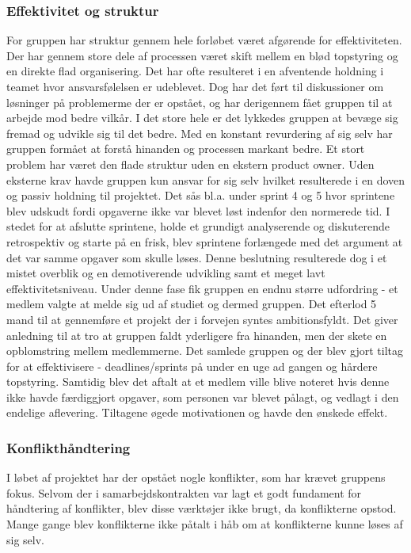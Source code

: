 \subsubsection{Effektivitet og struktur}
For gruppen har struktur gennem hele forløbet været afgørende for effektiviteten. Der har gennem store dele af processen været skift mellem en blød topstyring og en direkte flad organisering. Det har ofte resulteret i en afventende holdning i teamet hvor ansvarsfølelsen er udeblevet. Dog har det ført til diskussioner om løsninger på problemerme der er opstået, og har derigennem fået gruppen til at arbejde mod bedre vilkår. I det store hele er det lykkedes gruppen at bevæge sig fremad og udvikle sig til det bedre. Med en konstant revurdering af sig selv har gruppen formået at forstå hinanden og processen markant bedre.
Et stort problem har været den flade struktur uden en ekstern product owner. Uden eksterne krav havde gruppen kun ansvar for sig selv hvilket resulterede i en doven og passiv holdning til projektet. Det sås bl.a. under sprint 4 og 5 hvor sprintene blev udskudt fordi opgaverne ikke var blevet løst indenfor den normerede tid. I stedet for at afslutte  sprintene, holde et grundigt analyserende og diskuterende retrospektiv og starte på en frisk, blev sprintene forlængede med det argument at det var samme opgaver som skulle løses. Denne beslutning resulterede dog i et mistet overblik og en demotiverende udvikling samt et meget lavt effektivitetsniveau. Under denne fase fik gruppen en endnu større udfordring - et medlem valgte at melde sig ud af studiet og dermed gruppen. Det efterlod 5 mand til at gennemføre et projekt der i forvejen syntes ambitionsfyldt. Det giver anledning til at tro at gruppen faldt yderligere fra hinanden, men der skete en opblomstring mellem medlemmerne. Det samlede gruppen og der blev gjort tiltag for at effektivisere - deadlines/sprints på under en uge ad gangen og hårdere topstyring. Samtidig blev det aftalt at et medlem ville blive noteret hvis denne ikke havde færdiggjort opgaver, som personen var blevet pålagt, og vedlagt i den endelige aflevering. Tiltagene øgede motivationen og havde den ønskede effekt.

\subsubsection{Konflikthåndtering}
I løbet af projektet har der opstået nogle konflikter, som har krævet gruppens fokus. Selvom der i samarbejdskontrakten var lagt et godt fundament for håndtering af konflikter, blev disse værktøjer ikke brugt, da konflikterne opstod. Mange gange blev konflikterne ikke påtalt i håb om at konflikterne kunne løses af sig selv. 

